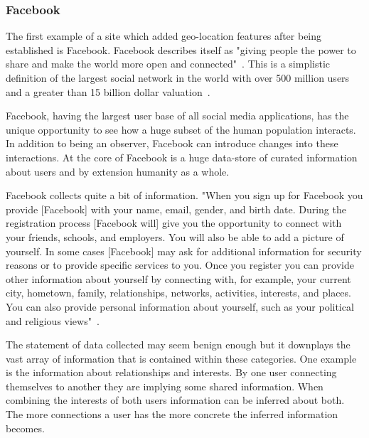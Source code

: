 
\subsubsection{Facebook} 
The first example of a site which added geo-location
features after being established is Facebook. Facebook describes itself as
"giving people the power to share and make the world more open and
connected"~\cite{fbabout}. This is a simplistic definition of the largest social
network in the world with over 500 million users and a greater than 15 billion dollar
valuation~\cite{fbcb}. 

Facebook, having the largest user base of all social media applications, has the
unique opportunity to see how a huge subset of the human population interacts. In
addition to being an observer, Facebook can introduce changes into these
interactions. At the core of Facebook is a huge data-store of curated information
about users and by extension humanity as a whole. 

Facebook collects quite a bit of information. "When you sign up for Facebook
you provide [Facebook] with your name, email, gender, and birth date. During the
registration process [Facebook will] give you the opportunity to connect with
your friends, schools, and employers. You will also be able to add a picture of
yourself. In some cases [Facebook] may ask for additional information for
security reasons or to provide specific services to you. Once you register you
can provide other information about yourself by connecting with, for example,
your current city, hometown, family, relationships, networks, activities,
interests, and places. You can also provide personal information about yourself,
such as your political and religious views"~\cite{fbpp}.

The statement of data collected may seem benign enough but it downplays the vast
array of information that is contained within these categories. One example is
the information about relationships and interests. By one user connecting
themselves to another they are implying some shared information. When combining
the interests of both users information can be inferred about both. The more
connections a user has the more concrete the inferred information becomes.

